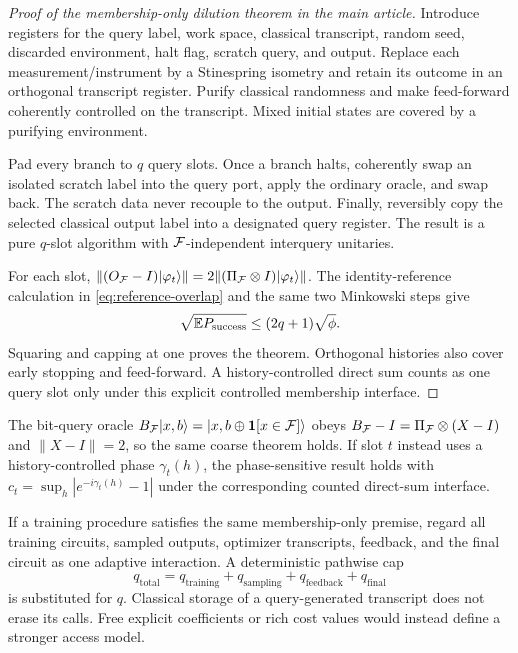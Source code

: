 \begin{proof}[Proof of the membership-only dilution theorem in the main article]
Introduce registers for the query label, work space, classical transcript,
random seed, discarded environment, halt flag, scratch query, and output.
Replace each measurement/instrument by a Stinespring isometry and retain its
outcome in an orthogonal transcript register. Purify classical randomness and
make feed-forward coherently controlled on the transcript. Mixed initial
states are covered by a purifying environment.

Pad every branch to $q$ query slots. Once a branch halts, coherently swap an
isolated scratch label into the query port, apply the ordinary oracle, and swap
back. The scratch data never recouple to the output. Finally, reversibly copy
the selected classical output label into a designated query register. The
result is a pure $q$-slot algorithm with $\mathcal{F}$-independent interquery unitaries.

For each slot, $\|(O_{\mathcal{F}}-I)|\varphi_t\rangle\|
=2\|(\Pi_{\mathcal{F}}\otimes I)|\varphi_t\rangle\|$. The identity-reference
calculation in \cref{eq:reference-overlap} and the same two Minkowski steps
give
\begin{equation}
 \sqrt{\mathbb{E} P_{\mathrm{success}}}\leq(2q+1)\sqrt\phi.
\end{equation}
Squaring and capping at one proves the theorem. Orthogonal histories also
cover early stopping and feed-forward. A history-controlled direct sum counts
as one query slot only under this explicit controlled membership interface.
\end{proof}

The bit-query oracle
$B_{\mathcal{F}}|x,b\rangle=|x,b\oplus\mathbf{1}[x\in\mathcal{F}]\rangle$ obeys
$B_{\mathcal{F}}-I=\Pi_{\mathcal{F}}\otimes(X-I)$ and $\|X-I\|=2$, so the same coarse theorem
holds. If slot $t$ instead uses a history-controlled phase $\gamma_t(h)$, the
phase-sensitive result holds with
$c_t=\sup_h|e^{-i\gamma_t(h)}-1|$ under the corresponding counted direct-sum
interface.

If a training procedure satisfies the same membership-only premise, regard
all training circuits, sampled outputs, optimizer transcripts, feedback, and
the final circuit as one adaptive interaction. A deterministic pathwise cap
\begin{equation}
 q_{\mathrm{total}}=q_{\mathrm{training}}+q_{\mathrm{sampling}}
 +q_{\mathrm{feedback}}+q_{\mathrm{final}}
\end{equation}
is substituted for $q$. Classical storage of a query-generated transcript
does not erase its calls. Free explicit coefficients or rich cost values would
instead define a stronger access model.

